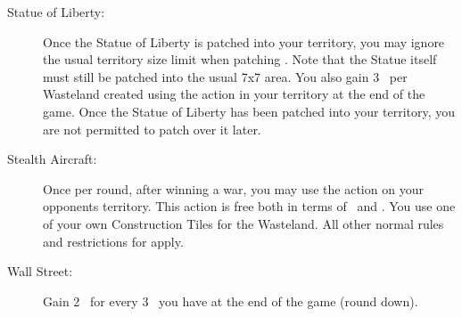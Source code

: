 \documentclass[10pt,twocolumn]{article}
\begin{document}
\begin{appendices}
\begin{description}
\item[Statue of Liberty:] Once the Statue of Liberty is patched into your territory, you may ignore the usual territory size limit when patching \landcards. Note that the Statue itself must still be patched into the usual 7x7 area. You also gain 3 \vps\ per Wasteland created using the  action in your territory at the end of the game. Once the Statue of Liberty has been patched into your territory, you are not permitted to patch over it later.
\item[Stealth Aircraft:] Once per round, after winning a war, you may use the  action on your opponents territory. This action is free both in terms of \goods\ and \polfs. You use one of your own Construction Tiles for the Wasteland. All other normal rules and restrictions for  apply.
\item[Wall Street:] Gain 2 \vps\ for every 3 \money\ you have at the end of the game (round down).
\end{description}

\end{appendices}
\end{document}
